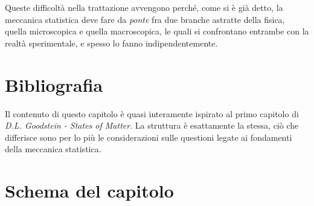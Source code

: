Queste difficoltà nella trattazione avvengono perché, come si è già detto, la meccanica statistica deve fare da \textit{ponte} fra due branche astratte della fisica, quella microscopica e quella macroscopica, le quali si confrontano entrambe con la realtà sperimentale, e spesso lo fanno indipendentemente.

\section{Bibliografia}

Il contenuto di questo capitolo è quasi interamente ispirato al primo capitolo di \textit{D.L. Goodstein - States of Matter}. La struttura è esattamente la stessa, ciò che differisce sono per lo più le considerazioni sulle questioni legate ai fondamenti della meccanica statistica.

\pagebreak

\section{Schema del capitolo}

